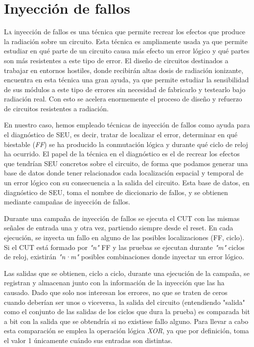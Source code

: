 \chapter{Inyección de fallos}
\label{ch:InyeccionDeFallos}

\lettrine[lraise=-0.1, lines=2, loversize=0.2]{L}{a} inyección de fallos es una
técnica que permite recrear los efectos que produce la radiación sobre un
circuito. Esta técnica es ampliamente usada ya que permite estudiar en qué parte
de un circuito causa más efecto un error lógico y qué partes son más resistentes a
este tipo de error. El diseño de circuitos destinados a trabajar en entornos 
hostiles, donde recibirán altas dosis de radiación ionizante, encuentra en esta
técnica una gran ayuda, ya que permite estudiar la sensibilidad de sus módulos a
este tipo de errores sin necesidad de fabricarlo y testearlo bajo radiación real.
Con esto se acelera enormemente el proceso de diseño y refuerzo de circuitos
resistentes a radiación.

En nuestro caso, hemos empleado técnicas de inyección de fallos como ayuda para el
diagnóstico de \gls{SEU}, es decir, tratar de localizar el error, determinar en 
qué biestable (\textit{\gls{FF}}) se ha producido la conmutación lógica y durante
qué ciclo de reloj ha ocurrido. El papel de la técnica en el diagnóstico es el de
recrear los efectos que tendrían \gls{SEU} concretos sobre el circuito, de forma
que podamos generar una base de datos donde tener relacionados cada localización
espacial y temporal de un error lógico con su consecuencia a la salida del
circuito. Esta base de datos, en diagnóstico de \gls{SEU}, toma el nombre de
diccionario de fallos, y se obtienen mediante campañas de inyección de fallos.

Durante una campaña de inyección de fallos se ejecuta el \gls{CUT} con las mismas
señales de entrada una y otra vez, partiendo siempre desde el reset. En cada
ejecución, se inyecta un fallo en alguno de las posibles localizaciones (\gls{FF}, 
ciclo). Si el \gls{CUT} está formado por \textit{"n"} \gls{FF} y las pruebas se 
ejecutan durante \textit{"m"} ciclos de reloj, existirán \textit{"n·m"} posibles 
combinaciones donde inyectar un error lógico.


Las salidas que se obtienen, ciclo a ciclo, durante una ejecución de la campaña, 
se registran y almacenan junto con la información de la inyección que las ha 
causado. Dado que solo nos interesan los errores, no que se traten de ceros cuando
deberían ser unos o viceversa, la salida del circuito (entendiendo "salida" como 
el conjunto de las salidas de los ciclos que dura la prueba) es comparada bit a 
bit con la salida que se obtendría si no existiese fallo alguno. Para llevar a 
cabo esta comparación se emplea la operación lógica \textit{XOR}, ya que por
definición, toma el valor 1 únicamente cuándo sus entradas son distintas.

